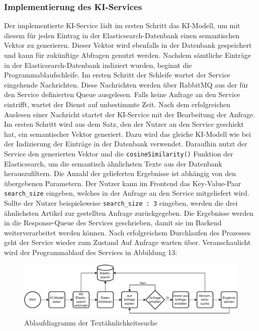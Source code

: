 \subsubsection{Implementierung des KI-Services}
Der implementierte KI-Service lädt im ersten Schritt das KI-Modell, um mit diesem für jeden Eintrag in der Elasticsearch-Datenbank einen semantischen Vektor zu generieren. Dieser Vektor wird ebenfalls in der Datenbank gespeichert und kann für zukünftige Abfragen genutzt werden.
Nachdem sämtliche Einträge in der Elasticsearch-Datenbank indiziert wurden, beginnt die Programmablaufschleife. Im ersten Schritt der Schleife wartet der Service eingehende Nachrichten. Diese Nachrichten werden über RabbitMQ aus der für den Service definierten Queue ausgelesen. Falls keine Anfrage an den Service eintrifft, wartet der Dienst auf unbestimmte Zeit. Nach dem erfolgreichen Auslesen einer Nachricht startet der KI-Service mit der Bearbeitung der Anfrage. Im ersten Schritt wird aus dem Satz, den der Nutzer an den Service geschickt hat, ein semantischer Vektor generiert. Dazu wird das gleiche KI-Modell wie bei der Indizierung der Einträge in der Datenbank verwendet. Daraufhin nutzt der Service den generierten Vektor und die \texttt{cosineSimilarity()} Funktion der Elasticsearch, um die semantisch ähnlichsten Texte aus der Datenbank herauszufiltern. Die Anzahl der gelieferten Ergebnisse ist abhängig von den übergebenen Parametern. Der Nutzer kann im Frontend das Key-Value-Paar \texttt{search\_{}size} eingeben, welches in der Anfrage an den Service mitgeliefert wird. Sollte der Nutzer beispielsweise \texttt{\glqq search\_{}size : 3\grqq{}} eingeben, werden die drei ähnlichsten Artikel zur gestellten Anfrage zurückgegeben. Die Ergebnisse werden in die Response-Queue des Services geschrieben, damit sie im Backend weiterverarbeitet werden können. Nach erfolgreichem Durchlaufen des Prozesses geht der Service wieder zum Zustand \glqq Auf Anfrage warten\grqq{} über. Veranschaulicht wird der Programmablauf des Services in Abbildung 13:

\begin{figure}[H]
  \centering
    \includegraphics[width = 15cm]{bilder/KIAblauf}
    \caption{Ablaufdiagramm der Textähnlichkeitssuche}
\end{figure}

